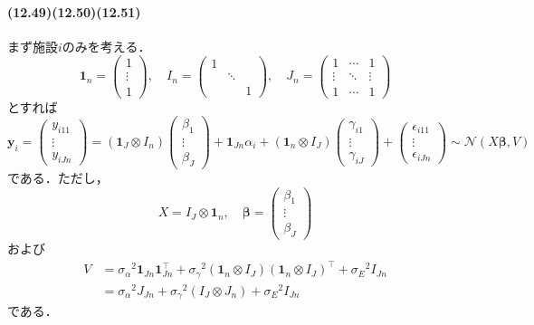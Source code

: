 \paragraph{(12.49)(12.50)(12.51)}
まず施設\(i\)のみを考える．
\[
\boldsymbol{1}_n =
\begin{pmatrix}
  1 \\ \vdots \\ 1
\end{pmatrix}
, \quad
I_n =
\begin{pmatrix}
  1 & & \\
  & \ddots & \\
  & & 1
\end{pmatrix}
, \quad
J_n =
\begin{pmatrix}
  1 & \cdots & 1 \\
  \vdots & \ddots & \vdots \\
  1 & \cdots & 1
\end{pmatrix}
\]
とすれば
\[
  \boldsymbol{y}_i
  =
  \begin{pmatrix}
    y_{i11} \\ \vdots \\ y_{iJn}
  \end{pmatrix}
  = (\boldsymbol{1}_J \otimes I_n)
  \begin{pmatrix}
    \beta_1 \\ \vdots \\ \beta_J
  \end{pmatrix}
  + \boldsymbol{1}_{Jn} \alpha_i
  + (\boldsymbol{1}_n \otimes I_J)
  \begin{pmatrix}
    \gamma_{i1} \\ \vdots \\ \gamma_{iJ}
  \end{pmatrix}
  +
  \begin{pmatrix}
    \epsilon_{i11} \\ \vdots \\ \epsilon_{iJn}
  \end{pmatrix}
  \sim \mathcal{N}(X \boldsymbol\beta, V)
\]
である．ただし，
\[
X = I_J \otimes \boldsymbol{1}_n , \quad
\boldsymbol\beta =
\begin{pmatrix}
  \beta_1 \\ \vdots \\ \beta_J
\end{pmatrix}
\]
および
\begin{align*}
  V &= \sigma_\alpha{}^2 \boldsymbol{1}_{Jn} \boldsymbol{1}_{Jn}^\top
  + \sigma_\gamma{}^2 (\boldsymbol{1}_n \otimes I_J) (\boldsymbol{1}_n \otimes I_J)^\top
  + \sigma_E{}^2 I_{Jn} \\
  &= \sigma_\alpha{}^2 J_{Jn} + \sigma_\gamma{}^2 (I_J \otimes J_n) + \sigma_E{}^2 I_{Jn}
\end{align*}
である．

